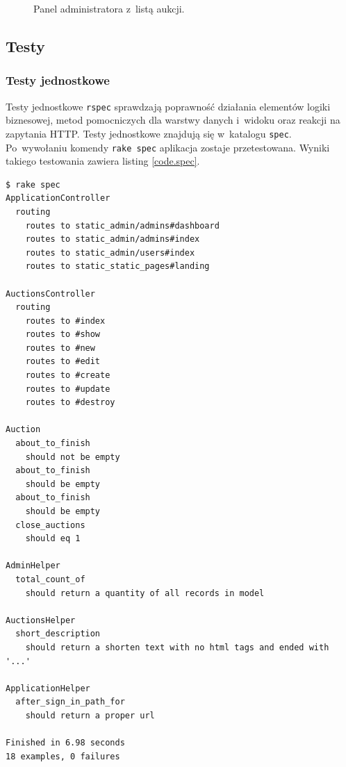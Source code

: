 \begin{figure}[h]
\centering
{}
\caption{Panel administratora z~listą aukcji.}
\label{screen08}
\end{figure}

\newpage

\subsection{Testy}

\subsubsection{Testy jednostkowe}

Testy jednostkowe \texttt{rspec} sprawdzają poprawność działania elementów logiki biznesowej, metod pomocniczych dla warstwy danych i~widoku oraz reakcji na zapytania HTTP. Testy jednostkowe znajdują się w~katalogu \texttt{spec}. Po~wywołaniu komendy \verb+rake spec+ aplikacja zostaje przetestowana. Wyniki takiego testowania zawiera listing \ref{code.spec}.

\begin{lstlisting}[label={code.spec}]
$ rake spec
ApplicationController
  routing
    routes to static_admin/admins#dashboard
    routes to static_admin/admins#index
    routes to static_admin/users#index
    routes to static_static_pages#landing

AuctionsController
  routing
    routes to #index
    routes to #show
    routes to #new
    routes to #edit
    routes to #create
    routes to #update
    routes to #destroy

Auction
  about_to_finish
    should not be empty
  about_to_finish
    should be empty
  about_to_finish
    should be empty
  close_auctions
    should eq 1

AdminHelper
  total_count_of
    should return a quantity of all records in model

AuctionsHelper
  short_description
    should return a shorten text with no html tags and ended with '...'

ApplicationHelper
  after_sign_in_path_for
    should return a proper url

Finished in 6.98 seconds
18 examples, 0 failures
\end{lstlisting}

